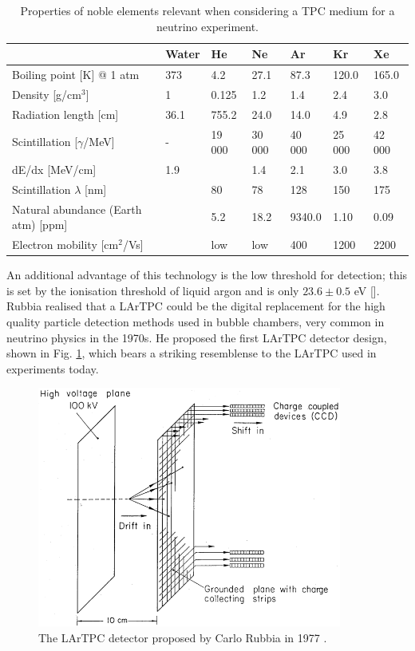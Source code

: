 \begin{table}[ht]
  \caption{Properties of noble elements relevant when considering a TPC medium for a neutrino experiment.}
  \label{tab:NobleProperties}
  \centering
  \begin{tabular}{ m{5cm} || m{1.5cm} | m{1.5cm} | m{1.5cm} | m{1.5cm} | m{1.5cm} | m{1.5cm} }
     & Water & He & Ne & \color{red} Ar & Kr & Xe \\
    \hline\hline
    Boiling point [K] @ 1 atm & 373 & 4.2 & 27.1 & \color{red} 87.3 & 120.0 & 165.0 \\
    \hline
    Density [g/cm$^3$] & 1 & 0.125 & 1.2 & \color{red} 1.4 & 2.4 & 3.0 \\
    \hline
    Radiation length [cm] & 36.1 & 755.2 & 24.0 & \color{red} 14.0 & 4.9 & 2.8 \\
    \hline
    Scintillation [$\gamma$/MeV] & - & 19 000 & 30 000 & \color{red} 40 000 & 25 000 & 42 000 \\
    \hline
    dE/dx [MeV/cm] & 1.9 & & 1.4 & \color{red} 2.1 & 3.0 & 3.8 \\
    \hline
    Scintillation $\lambda$ [nm] & & 80 & 78 & \color{red} 128 & 150 & 175 \\
    \hline
    Natural abundance (Earth atm) [ppm] & & 5.2 & 18.2 & \color{red} 9340.0 & 1.10 & 0.09 \\
    \hline
    Electron mobility [cm$^2$/Vs] & & low & low & \color{red} 400 & 1200 & 2200 \\
    \hline\hline
  \end{tabular}
\end{table}

An additional advantage of this technology is the low threshold for detection; this is set by the ionisation threshold of liquid argon and is only $23.6 \pm 0.5$ eV [].  Rubbia realised that a LArTPC could be the digital replacement for the high quality particle detection methods used in bubble chambers, very common in neutrino physics in the 1970s.  He proposed the first LArTPC detector design, shown in Fig. \ref{fig:RubbiaLArTPC}, which bears a striking resemblense to the LArTPC used in experiments today.

\begin{figure}[ht]
  \centering
  \includegraphics[width=10cm]{RubbiaLArTPC.png}
  \caption{The LArTPC detector proposed by Carlo Rubbia in 1977 \cite{Rubbia1977}.}
  \label{fig:RubbiaLArTPC}
\end{figure}

